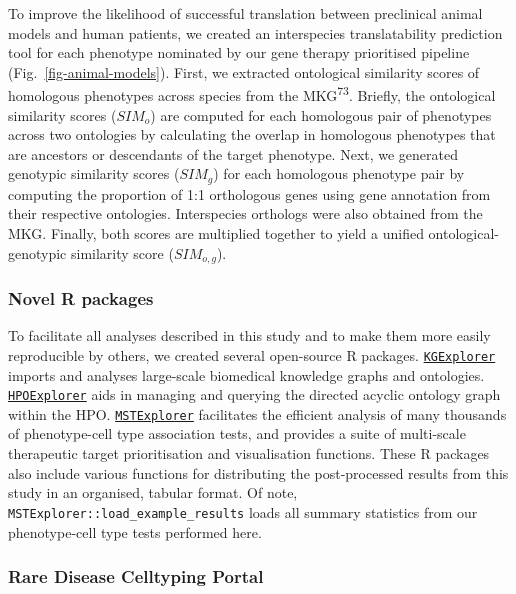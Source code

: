 \documentclass[
sn-nature
]{sn-jnl}
\begin{document}
To improve the likelihood of successful translation between preclinical
animal models and human patients, we created an interspecies
translatability prediction tool for each phenotype nominated by our gene
therapy prioritised pipeline (Fig.~\ref{fig-animal-models}). First, we
extracted ontological similarity scores of homologous phenotypes across
species from the MKG\textsuperscript{73}. Briefly, the ontological
similarity scores (\(SIM_o\)) are computed for each homologous pair of
phenotypes across two ontologies by calculating the overlap in
homologous phenotypes that are ancestors or descendants of the target
phenotype. Next, we generated genotypic similarity scores (\(SIM_g\))
for each homologous phenotype pair by computing the proportion of 1:1
orthologous genes using gene annotation from their respective
ontologies. Interspecies orthologs were also obtained from the MKG.
Finally, both scores are multiplied together to yield a unified
ontological-genotypic similarity score (\(SIM_{o,g}\)).

\subsubsection{Novel R packages}\label{novel-r-packages}

To facilitate all analyses described in this study and to make them more
easily reproducible by others, we created several open-source R
packages.
\href{https://github.com/neurogenomics/KGExplorer}{\texttt{KGExplorer}}
imports and analyses large-scale biomedical knowledge graphs and
ontologies.
\href{https://github.com/neurogenomics/HPOExplorer}{\texttt{HPOExplorer}}
aids in managing and querying the directed acyclic ontology graph within
the HPO.
\href{https://github.com/neurogenomics/MSTExplorer}{\texttt{MSTExplorer}}
facilitates the efficient analysis of many thousands of phenotype-cell
type association tests, and provides a suite of multi-scale therapeutic
target prioritisation and visualisation functions. These R packages also
include various functions for distributing the post-processed results
from this study in an organised, tabular format. Of note,
\texttt{MSTExplorer::load\_example\_results} loads all summary
statistics from our phenotype-cell type tests performed here.

\subsubsection{Rare Disease Celltyping
Portal}\label{rare-disease-celltyping-portal}
\end{document}
